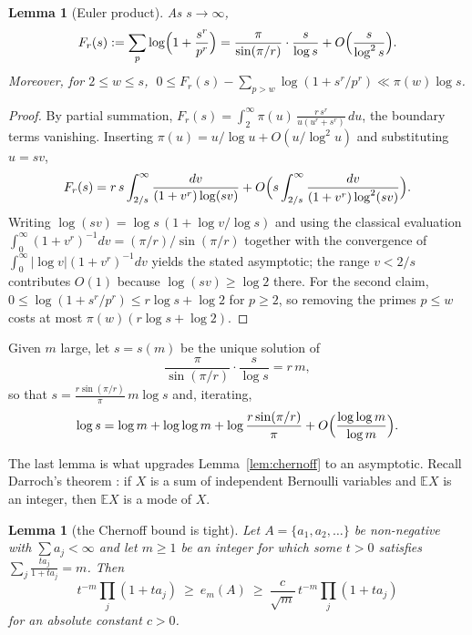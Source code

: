 \documentclass[10pt,a4paper]{amsart}
\newtheorem{lemma}[theorem]{Lemma}
\numberwithin{equation}{section}
\begin{document}
\begin{lemma}[Euler product]\label{lem:euler}
As $s\to\infty$,
\[
  F_r(s):=\sum_{p}\log\Bigl(1+\frac{s^{r}}{p^{r}}\Bigr)
  =\frac{\pi}{\sin(\pi/r)}\cdot\frac{s}{\log s}+O\Bigl(\frac{s}{\log^{2}s}\Bigr).
\]
Moreover, for $2\le w\le s$, $\;0\le F_r(s)-\sum_{p>w}\log(1+s^{r}/p^{r})\ll\pi(w)\log s$.
\end{lemma}

\begin{proof}
By partial summation, $F_r(s)=\int_{2}^{\infty}\pi(u)\,\frac{r\,s^{r}}{u(u^{r}+s^{r})}\,du$,
the boundary terms vanishing. Inserting $\pi(u)=u/\log u+O(u/\log^{2}u)$ and substituting
$u=sv$,
\[
  F_r(s)=r\,s\int_{2/s}^{\infty}\frac{dv}{(1+v^{r})\log(sv)}
  +O\Bigl(s\int_{2/s}^{\infty}\frac{dv}{(1+v^{r})\log^{2}(sv)}\Bigr).
\]
Writing $\log(sv)=\log s\,(1+\log v/\log s)$ and using the classical evaluation
$\int_0^{\infty}(1+v^{r})^{-1}dv=(\pi/r)/\sin(\pi/r)$ together with the convergence of
$\int_0^{\infty}|\log v|(1+v^{r})^{-1}dv$ yields the stated asymptotic; the range
$v<2/s$ contributes $O(1)$ because $\log(sv)\ge\log2$ there. For the second claim,
$0\le\log(1+s^{r}/p^{r})\le r\log s+\log2$ for $p\ge2$, so removing the primes $p\le w$
costs at most $\pi(w)(r\log s+\log2)$.
\end{proof}

Given $m$ large, let $s=s(m)$ be the unique solution of
\begin{equation}\label{eq:saddle}
  \frac{\pi}{\sin(\pi/r)}\cdot\frac{s}{\log s}=r\,m ,
\end{equation}
so that $s=\frac{r\sin(\pi/r)}{\pi}\,m\log s$ and, iterating,
\begin{equation}\label{eq:logs}
  \log s=\log m+\log\log m+\log\frac{r\sin(\pi/r)}{\pi}+O\Bigl(\frac{\log\log m}{\log m}\Bigr).
\end{equation}

The last lemma is what upgrades Lemma~\ref{lem:chernoff} to an asymptotic. Recall
Darroch's theorem \cite{Darroch}: if $X$ is a sum of independent Bernoulli variables and
$\mathbb E X$ is an integer, then $\mathbb E X$ is a mode of $X$.

\begin{lemma}[the Chernoff bound is tight]\label{lem:local}
Let $A=\{a_1,a_2,\dots\}$ be non-negative with $\sum a_j<\infty$ and let $m\ge1$ be an
integer for which some $t>0$ satisfies $\sum_j\frac{ta_j}{1+ta_j}=m$. Then
\[
  t^{-m}\prod_j(1+ta_j)\ \ge\ e_m(A)\ \ge\ \frac{c}{\sqrt m}\,t^{-m}\prod_j(1+ta_j)
\]
for an absolute constant $c>0$.
\end{lemma}
\end{document}
